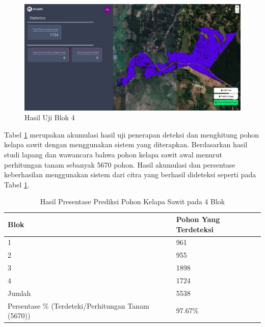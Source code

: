 \begin{figure}[H]
	\vspace{-0.1cm}
	\begin{center}
		\includegraphics[width=1\columnwidth]{bab4/Gambar/Picture43.jpg}
	\end{center}
	\vspace{-0.2cm}
	\captionsetup{justification=centering}
	\caption{Hasil Uji Blok 4}\label{img:Hasil-Uji-Blok-4}
\end{figure}

Tabel \ref{tbl:Hasil-Presentase-Prediksi-Pohon-Kelapa-Sawit-Pada-4-Blok} merupakan akumulasi hasil uji penerapan deteksi dan menghitung pohon kelapa sawit dengan menggunakan sistem yang diterapkan. Berdasarkan hasil studi lapang dan wawancara bahwa pohon kelapa sawit awal menurut perhitungan tanam sebanyak 5670 pohon. Hasil akumulasi dan persentase keberhasilan menggunakan sistem dari citra yang berhasil dideteksi seperti pada Tabel \ref{tbl:Hasil-Presentase-Prediksi-Pohon-Kelapa-Sawit-Pada-4-Blok}. 


\begin{singlespace}
	\begin{table}[H]
		\centering
		\caption{Hasil Presentase Prediksi Pohon Kelapa Sawit pada 4 Blok}
		\label{tbl:Hasil-Presentase-Prediksi-Pohon-Kelapa-Sawit-Pada-4-Blok}
		\begin{tabular}{|m{4cm}|m{4cm}|}
			\hline
			\rowcolor[HTML]{D9D9D9} 
			Blok                       & Pohon Yang Terdeteksi \\ \hline
			1                          & 961                   \\ \hline
			2                          & 955                   \\ \hline
			3                          & 1898                  \\ \hline
			4                          & 1724                  \\ \hline
			Jumlah                     & 5538                  \\ \hline
			Persentase \% (Terdeteki/Perhitungan Tanam (5670)) & 97.67\%               \\ \hline
		\end{tabular}
	\end{table}
\end{singlespace}

